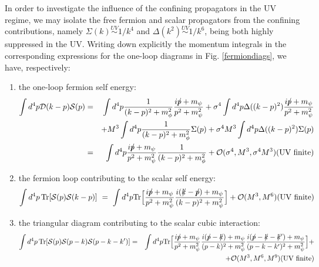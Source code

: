 In order to investigate the influence of the confining propagators in the UV regime, we may
isolate the free fermion and scalar propagators from the confining contributions, namely
$\Sigma(k)\stackrel{UV}{\sim} 1/k^4$ and $\Delta(k^2)\stackrel{UV}{\sim} 1/k^6$, being both
highly suppressed in the UV. Writing down explicitly the momentum integrals in the
corresponding expressions for the one-loop diagrams in Fig. \ref{fermiondiags}, we have,
respectively:
\begin{enumerate}[label=(\alph*)]
\item the one-loop fermion self energy:
\begin{eqnarray}
 \int d^4 p {\cal D}(k-p) {\cal S}(p)
 &=&   \int d^4 p  \frac{1}{(k-p)^2 +  m_{\phi}^2} \frac{ip \hspace{-1.7mm} / +m_{\psi}}{p^2 +  m_{\psi}^2}
+ \sigma^4  \int d^4 p {\Delta}((k-p)^2) \frac{ip \hspace{-1.7mm} / +m_{\psi}}{p^2 +  m_{\psi}^2}
\nonumber\\&&
+ M^3 \int d^4 p  \frac{1}{(k-p)^2 +  m_{\phi}^2} \Sigma(p)
+ \sigma^4 M^3 \int d^4 p {\Delta}((k-p)^2)\Sigma(p) \nonumber
 \\
& =& \int d^4 p \frac{ip \hspace{-1.7mm} / +m_{\psi}}{p^2 +  m_{\psi}^2} \frac{1}{(k-p)^2 +  m_{\phi}^2} +
{\cal O}(\sigma^4, M^3, \sigma^4 M^3) (\text{UV finite}) 
\end{eqnarray}

\item  the fermion loop contributing to the scalar self energy:
\begin{equation}
 \int d^4 p\, {\rm Tr}[{\cal S}(p){\cal S}(k-p) ] ~=~ \int d^4 p {\rm Tr}\Big[\frac{ip \hspace{-1.7mm} /
+m_{\psi}}{p^2 +  m_{\psi}^2} \frac{i(k \hspace{-1.7mm} / -p \hspace{-1.7mm} /)+ m_{\psi}}{(k-p)^2 +  m_{\psi}^2}
\Big]+ {\cal O}( M^3, M^6) (\text{UV finite}) 
\end{equation}

\item the triangular diagram contributing to the scalar cubic interaction:
\begin{eqnarray}
 \int d^4 p\, {\rm Tr}[{\cal S}(p){\cal S}(p-k){\cal S}(p-k-k') ]
 &=& \int d^4 p {\rm Tr}\Big[ \frac{i\pslash +m_{\psi}}{p^2 +  m_{\psi}^2}
\frac{i(\pslash-\kslash) +m_{\psi}}{(p-k)^2 +  m_{\psi}^2} \frac{i(\pslash -\kslash -\kslash')+
m_{\psi}}{(p-k-k')^2 +  m_{\psi}^2}\Big] +\nonumber \\
 &&+ {\cal O}( M^3, M^6, M^{9}) (\text{UV finite}) 
\end{eqnarray}


\end{enumerate}

